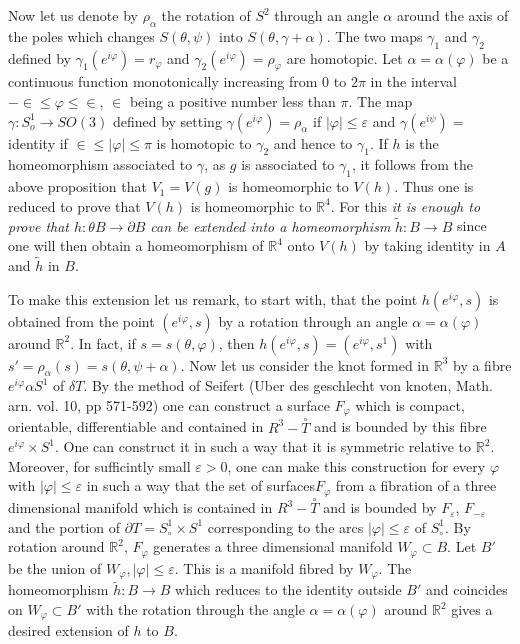 Now let us denote by $\rho_{\alpha}$ the rotation of $S^2$ through an angle 
$\alpha$ around the axis of the poles which changes $S(\theta, \psi)$ into
$S(\theta, \gamma + \alpha)$. The two maps $\gamma_1$ and $\gamma_2$
defined by $\gamma_1 (e^{i \varphi}) = r_\varphi$ and\pageoriginale
$\gamma_2 (e^{i \varphi})=\rho_\varphi$ are 
homotopic. Let $\alpha = \alpha (\varphi)$ be a continuous function
monotonically increasing from 0 to $2 \pi$ in the interval $- \in
\leq \varphi \leq \in$, $\in$ being a positive number less than
$\pi$. The map $\gamma: S^1_o \to SO (3)$ defined by setting $\gamma
(e^{i \varphi} ) = \rho_\alpha$ if $|\varphi| \leq \varepsilon$ and
$\gamma (e^{i \psi})=$ identity if $\in \leq | \varphi | \leq \pi$ is
homotopic to 
$\gamma_2$ and hence to $\gamma_1$. If $h$ is the homeomorphism
associated to $\gamma$, as $g$ is associated to $\gamma_1$, it follows
from the above proposition that $V_1 = V(g)$ is homeomorphic to
$V(h)$. Thus one is reduced to prove that $V(h)$ is homeomorphic to
$\mathbb{R}^4$. For this \textit{it is enough to prove that $h:
\theta B \to \partial B$ can be extended into a homeomorphism}
$\tilde{h}: B \to B$ since one will then obtain a homeomorphism of
$\mathbb{R}^4$ onto $V(h)$ by taking identity in $A$ and $\tilde{h}$
in $B$. 

To make this extension let us remark, to start with, that the point
$h(e^{i \varphi}, s)$ is obtained from the point $(e^{i \varphi}, s)$ by
a rotation through an angle $\alpha = \alpha (\varphi)$ around
$\mathbb{R}^2$. In fact, if $s = s (\theta, \varphi)$, then $h(e^{i
  \varphi}, s) = (e^{i \varphi}, s^1)$ with $s' = \rho_\alpha (s) =
s(\theta, \psi + \alpha)$. Now let us consider the knot formed in
$\mathbb{R}^3$ by a fibre $e^{i \varphi } \alpha S^1$ of $\delta
T$. By the method of  Seifert (Uber des geschlecht von knoten,
Math. arn. vol. 10, pp 571-592) one can construct a surface
$F_{\varphi}$ which is compact, orientable, differentiable and
contained in $R^3 - \overset{\circ}{T}$ and is bounded by this fibre $e^{i
  \varphi} \times S^1$. One can construct it in such a way that it is 
symmetric relative to $\mathbb{R}^2$. Moreover, for sufficintly small
$\varepsilon > 0$, one can make this construction for every $\varphi$ with
$|\varphi| \leq \varepsilon$ in such a way that the set of
surfaces\pageoriginale $F_{\varphi}$ from a fibration of a three
dimensional manifold which 
is contained in $R^3 - \overset{\circ}{T}$ and is bounded by
$F_{\varepsilon}$, $F_{- \varepsilon}$ and the portion of $\partial T =
S_\circ^1 \times S^1$ corresponding to the arcs $|\varphi| \leq \varepsilon$
of $S^1_\circ$. By rotation around $\mathbb{R}^2$, $F_{\varphi}$ generates a
three dimensional manifold $W_{\varphi} \subset B$. Let $B'$ be the
union of $W_{\varphi}, |\varphi| \leq \varepsilon$. This is a
manifold fibred by $W_{\varphi}$. The homeomorphism $\tilde{h} : B \to
B$ which reduces to the identity outside $B'$ and coincides on
$W_{\varphi} \subset B'$ with the rotation through the angle $\alpha =
\alpha (\varphi)$ around $\mathbb{R}^2$ gives a desired extension of
$h$ to $B$. 
